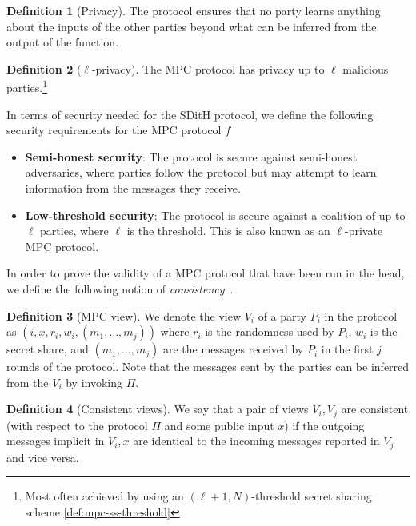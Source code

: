 \documentclass[11pt]{report}
\theoremstyle{definition}
\newtheorem{definition}{Definition}[section]
\theoremstyle{plain}
\begin{document}
\begin{definition}[Privacy]\label{def:mpc-privacy}
  The protocol ensures that no party learns anything about the inputs of the other parties beyond what can be inferred from the output of the function.
\end{definition}

\begin{definition}[$\ell$-privacy]\label{def:mpc-ell-privacy}
  The MPC protocol has privacy up to $\ell$ malicious parties.\footnote{Most often achieved by using an $(\ell + 1, N)$-threshold secret sharing scheme \autoref{def:mpc-ss-threshold}}
\end{definition}

In terms of security needed for the SDitH protocol, we define the following security requirements for the MPC protocol $f$

\begin{itemize}
  \item \textbf{Semi-honest security}: The protocol is secure against semi-honest adversaries, where parties follow the protocol but may attempt to learn information from the messages they receive.
  \item \textbf{Low-threshold security}: The protocol is secure against a coalition of up to $\ell$ parties, where $\ell$ is the threshold. This is also known as an $\ell$-private MPC protocol.
\end{itemize}

In order to prove the validity of a MPC protocol that have been run in the head, we define the following notion of \textit{consistency}~\cite{ishai2007zero}.

\begin{definition}[MPC view]\label{def:mpc-view}
  We denote the view $V_i$ of a party $P_i$ in the protocol as $(i, x, r_i, w_i, (m_1, \dots, m_j))$ where $r_i$ is the randomness used by $P_i$, $w_i$ is the secret share, and $(m_1, \dots, m_j)$ are the messages received by $P_i$ in the first $j$ rounds of the protocol. Note that the messages sent by the parties can be inferred from the $V_i$ by invoking $\Pi$.
\end{definition}

\begin{definition}[Consistent views]\label{def:mpc-consistent-view}
  We say that a pair of views $V_i, V_j$ are consistent (with respect to the protocol $\Pi$ and some public input $x$) if the outgoing messages implicit in $V_i, x$ are identical to the incoming messages reported in $V_j$ and vice versa.
\end{definition}
\end{document}
